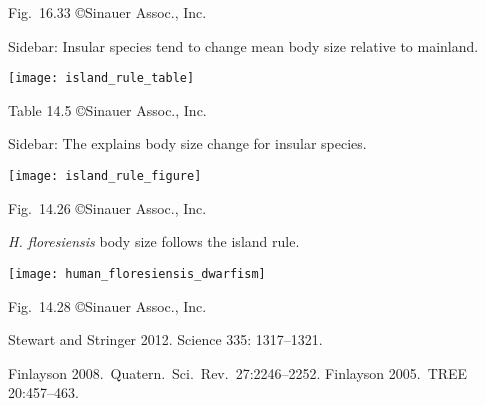 \documentclass[t]{beamer}
\begin{document}
%
{
\begin{frame}[b]{}

	\vfilll
	
	\tiny Fig.~16.33 \copyright Sinauer Assoc., Inc.

\end{frame}}
%
\begin{frame}{Sidebar: Insular species tend to change mean body size relative to mainland.}
	\vspace{-\baselineskip}
	\begin{center}
		\texttt{[image: island\_rule\_table]}
	\end{center}

	\vfilll
	
	\hfill \tiny Table 14.5 \copyright Sinauer Assoc., Inc.
\end{frame}
%
\begin{frame}{Sidebar: The  explains body size change for insular species.}
	\vspace{-\baselineskip}
	\begin{center}
		\texttt{[image: island\_rule\_figure]}
	\end{center}

	\vfilll
	
	\hfill \tiny Fig.~14.26 \copyright Sinauer Assoc., Inc.
	
\end{frame}
%
\begin{frame}{\textit{H. floresiensis} body size follows the island rule.}
	\vspace{-\baselineskip}
	\begin{center}
		\texttt{[image: human\_floresiensis\_dwarfism]}
	\end{center}

	\vfilll

	\hfill \tiny Fig.~14.28 \copyright Sinauer Assoc., Inc.
	
\end{frame}
%
{
\begin{frame}[b]{}

\tiny Stewart and Stringer 2012. Science 335: 1317–1321.
\end{frame}}
%
{
\begin{frame}[b]{}

\tiny Finlayson 2008.~Quatern.~Sci.~Rev.~27:2246–2252. \hfill Finlayson 2005.~TREE 20:457–463.
\end{frame}
}
\end{document}
